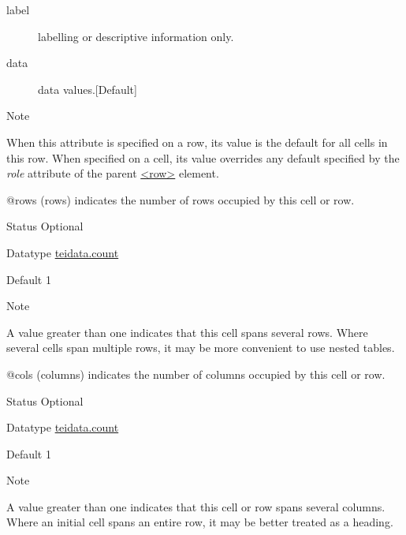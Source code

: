 \begin{reflist}
\begin{sansreflist}
\begin{reflist}
\begin{description}
\item[{label}]labelling or descriptive information only.
\item[{data}]data values.{[Default] }
\end{description} 
    \item[{Note}]
  \par
When this attribute is specified on a row, its value is the default for all cells in this row. When specified on a cell, its value overrides any default specified by the {\itshape role} attribute of the parent \hyperref[TEI.row]{<row>} element.
\end{reflist}  
    \item[@rows]
  (rows) indicates the number of rows occupied by this cell or row.
\begin{reflist}
    \item[{Status}]
  Optional
    \item[{Datatype}]
  \hyperref[TEI.teidata.count]{teidata.count}
    \item[{Default}]
  1
    \item[{Note}]
  \par
A value greater than one indicates that this cell  spans several rows. Where several cells span multiple rows, it may be more convenient to use nested tables.
\end{reflist}  
    \item[@cols]
  (columns) indicates the number of columns occupied by this cell or row.
\begin{reflist}
    \item[{Status}]
  Optional
    \item[{Datatype}]
  \hyperref[TEI.teidata.count]{teidata.count}
    \item[{Default}]
  1
    \item[{Note}]
  \par
A value greater than one indicates that this cell or row spans several columns. Where an initial cell spans an entire row, it may be better treated as a heading.
\end{reflist}  
\end{sansreflist}  
\end{reflist}  
